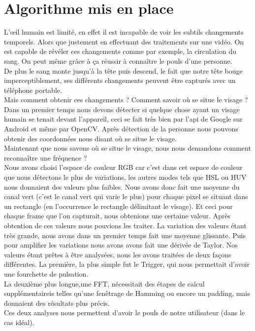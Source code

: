 \section{Algorithme mis en place}

L’\oe il humain est limité, en effet il est incapable de voir les subtils changements temporels. Alors
que justement en effectuant des traitements sur une vidéo. On est capable de révéler ces changements
comme par exemple, la circulation du sang. On peut même grâce à ça réussir à connaître le pouls d'une
personne.
\\
De plus le sang monte jusqu'à la tête puis descend, le fait que notre tête bouge imperceptiblement, ses différents changements peuvent être capturés avec un téléphone portable.
\\
Mais comment obtenir ces changements ? Comment savoir où se situe le visage ?\\

 Dans un premier temps nous devons détecter si quelque chose ayant un visage humain se tenait devant l'appareil, ceci se fait très bien par l'api de Google sur Android et même par OpenCV.
 Après détection de la personne nous pouvons obtenir des coordonnées nous disant où se situe le visage.\\
 Maintenant que nous savons où se situe le visage, nous nous demandons comment reconnaître une fréquence ?\\
 Nous avons choisi l'espace de couleur RGB car c'est dans cet espace de couleur que nous détectons le plus de variations, les autres modes tels que HSL ou HUV nous donnaient des valeurs plus faibles.
 Nous avons donc fait une moyenne du canal vert (c'est le canal vert qui varie le plus) pour chaque pixel se situant dans un rectangle (en l’occurrence le rectangle délimitant le visage).
 Et ceci pour chaque frame que l'on capturait, nous obtenions une certaine valeur.
 Après obtention de ces valeurs nous pouvions les traiter.
 La variation des valeurs étant très grande, nous avons dans un premier temps fait une moyenne glissante. Puis pour amplifier les variations nous avons avons fait une dérivée de Taylor.
 Nos valeurs étant prêtes à être analysées, nous les avons traitées de deux façons différentes.
 La première, la plus simple fut le Trigger, qui nous permettait d'avoir une fourchette de pulsation.\\ La deuxième plus longue,une FFT, nécessitait des étapes de calcul supplémentaireis telles qu'une fenêtrage de Hamming ou encore un padding, mais donnaient des résultats plus précis.
 \\
 Ces deux analyses nous permettent d'avoir le pouls de notre utilisateur (dans le cas idéal).
 \\ 

